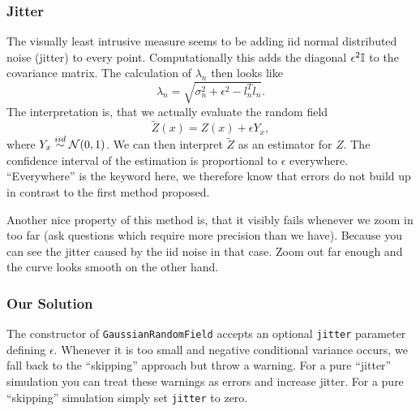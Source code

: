 \subsubsection{Jitter}

The visually least intrusive measure seems to be adding iid normal distributed
noise (jitter) to every point. Computationally this adds the diagonal \(\epsilon^2
\mathbb{I}\) to the covariance matrix. The calculation of \(\lambda_n\) then
looks like
\[
	\lambda_n = \sqrt{\sigma_n^2 + \epsilon^2 - l_n^T l_n}.
\]
The interpretation is, that we actually evaluate the random field
\[
	\tilde{Z}(x) = Z(x) + \epsilon Y_x,
\]
where \(Y_x\overset{iid}\sim\mathcal{N}(0,1)\). We can then interpret \(\tilde{Z}\)
as an estimator for \(Z\). The confidence interval of the estimation is
proportional to \(\epsilon\) everywhere. ``Everywhere'' is the keyword here, we
therefore know that errors do not build up in contrast to the first method
proposed.

Another nice property of this method is, that it visibly fails whenever we zoom
in too far (ask questions which require more precision than we have). Because
you can see the jitter caused by the iid noise in that case. Zoom out far enough
and the curve looks smooth on the other hand.

\subsubsection{Our Solution}

The constructor of \texttt{GaussianRandomField} accepts an optional 
\texttt{jitter} parameter defining \(\epsilon\). Whenever it is too
small and negative conditional variance occurs, we fall back to the ``skipping''
approach but throw a warning. For a pure ``jitter'' simulation you can treat these
warnings as errors and increase jitter. For a pure ``skipping'' simulation
simply set \texttt{jitter} to zero.

